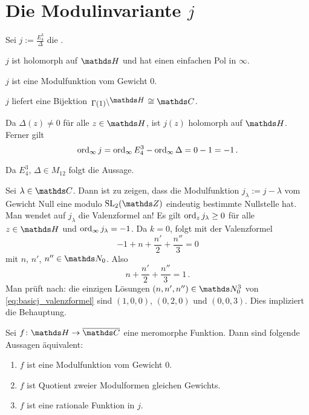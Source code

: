 \section[Die Modulinvariante \texorpdfstring{$j$}{j}]{Die Modulinvariante {\boldmath $j$}}

\begin{defi}
Sei $j := \frac{E_4^3}{\Delta}$ die .
\end{defi}

\begin{satz-list}\label{satz:j_eigenschaften}
	\item $j$ ist holomorph auf $\HH$ und hat einen einfachen Pol in $\infty$.
	\item $j$ ist eine Modulfunktion vom Gewicht $0$.
	\item $j$ liefert eine Bijektion $\linksmodulo{\Gamma(1)}{\HH} \cong \CC$.
\end{satz-list}

\begin{bewe-list}
	\item  Da $\Delta(z) \not= 0$ für alle $z\in\HH$, ist $j(z)$ holomorph auf $\HH$.
	Ferner gilt
	\[
	\operatorname{ord}_\infty j = \operatorname{ord}_\infty E_4^3 - \operatorname{ord}_\infty \Delta = 0 - 1 = -1
	\,.
	\]
	\item Da $E_4^3$, $\Delta \in M_{12}$ folgt die Aussage.
	\item Sei $\lambda \in \CC$. Dann ist zu zeigen, dass die Modulfunktion $j_\lambda := j - \lambda$ vom Gewicht Null eine modulo $\SL_2(\ZZ)$ eindeutig bestimmte Nullstelle hat.
	Man wendet auf $j_\lambda$ die Valenzformel an!
	Es gilt $\operatorname{ord}_z j_\lambda \geq 0$ für alle $z\in\HH$ und $\operatorname{ord}_\infty j_\lambda = -1$.
	Da $k = 0$, folgt mit der Valenzformel
	\[
	-1 + n + \frac{n'}{2} + \frac{n''}{3} = 0
	\]
	mit $n$, $n'$, $n'' \in \NN_0$.
	Also
	\begin{equation}\label{eq:basicj_valenzformel}
	n + \frac{n'}{2} + \frac{n''}{3} = 1
	\,.
	\end{equation}
	Man prüft nach: die einzigen Lösungen $(n,n',n'') \in \NN_0^3$ von \eqref{eq:basicj_valenzformel} sind $(1,0,0)$, $(0,2,0)$ und $(0,0,3)$.
	Dies impliziert die Behauptung.
\end{bewe-list}

\begin{satz}\label{satz:charakterisierung_modulfunktion_0}
	Sei $f\colon \HH \to \closure{\CC}$ eine meromorphe Funktion. Dann sind folgende Aussagen äquivalent:
	\begin{enumerate}
		\item $f$ ist eine Modulfunktion vom Gewicht 0.
		\item $f$ ist Quotient zweier Modulformen gleichen Gewichts.
		\item $f$ ist eine rationale Funktion in $j$.
	\end{enumerate}
\end{satz}

